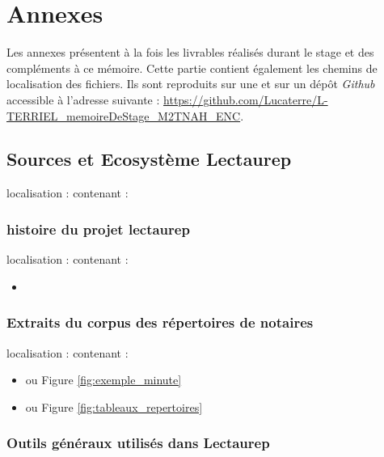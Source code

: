 

\appendix
\part*{Annexes}
\pagestyle{myheadings}

Les annexes présentent à la fois les livrables réalisés durant le stage et des compléments à ce mémoire. Cette partie contient également les chemins de localisation des fichiers. Ils sont reproduits sur une  et sur un dépôt \textit{Github} accessible à l'adresse suivante : \url{https://github.com/Lucaterre/L-TERRIEL_memoireDeStage_M2TNAH_ENC}.
\newpage
\thispagestyle{empty}
\chapter{Sources et Ecosystème Lectaurep}

localisation :  contenant :

\section{histoire du projet lectaurep}
localisation :  contenant :
\begin{itemize}
    \item {}
\end{itemize}


\section{Extraits du corpus des répertoires de notaires}
localisation :  contenant :
\begin{itemize}
    \item {} ou Figure  \ref{fig:exemple_minute}
    \item {} ou Figure  \ref{fig:tableaux_repertoires}
\end{itemize}

\section{Outils généraux utilisés dans Lectaurep}

